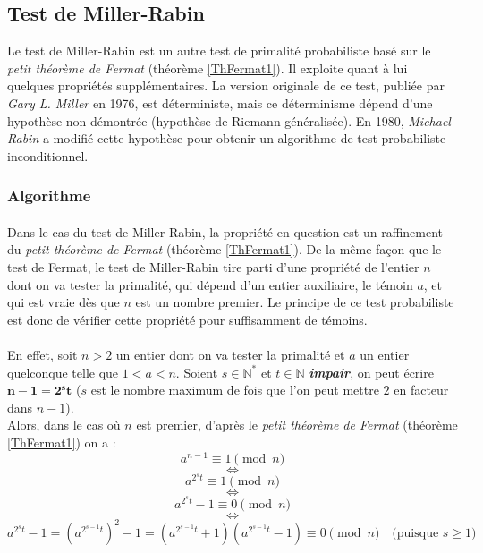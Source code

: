 \subsection{Test de Miller-Rabin}
	Le test de Miller-Rabin est un autre test de primalité probabiliste basé sur le \textit{petit théorème de Fermat} (théorème \ref{ThFermat1}). Il exploite quant à lui quelques propriétés supplémentaires. La version originale de ce test, publiée par \textit{Gary L. Miller} en 1976, est déterministe, mais ce déterminisme dépend d'une hypothèse non démontrée (hypothèse de Riemann généralisée). En 1980, \textit{Michael Rabin} a modifié cette hypothèse pour obtenir un algorithme de test probabiliste inconditionnel.
	
	\subsubsection{Algorithme}
		
		\paragraph{} Dans le cas du test de Miller-Rabin, la propriété en question est un raffinement du \textit{petit théorème de Fermat} (théorème \ref{ThFermat1}). De la même façon que le test de Fermat, le test de Miller-Rabin tire parti d'une propriété de l'entier $n$ dont on va tester la primalité, qui dépend d'un entier auxiliaire, le témoin $a$, et qui est vraie dès que $n$ est un nombre premier. Le principe de ce test probabiliste est donc de vérifier cette propriété pour suffisamment de témoins.
		
		\paragraph{}En effet, soit $n > 2$ un entier dont on va tester la primalité et $a$ un entier quelconque telle que $1 < a < n$. Soient $s \in \mathbb{N}^{*}$ et $t \in \mathbb{N}$ \textbf{\textit{impair}}, on peut écrire $\mathbf{n - 1 = 2^{s}t}$ ($s$ est le nombre maximum de fois que l'on peut mettre $2$ en facteur dans $n - 1$).\\
		Alors, dans le cas où $n$ est premier, d'après le \textit{petit théorème de Fermat} (théorème \ref{ThFermat1}) on a :
		\[a^{n-1}\equiv 1 \pmod n\]
		\[\Leftrightarrow\]
		\[a^{2^{s}t}\equiv 1 \pmod n\]
		\[\Leftrightarrow\]
		\[a^{2^{s}t} - 1 \equiv 0 \pmod n\]
		\[\Leftrightarrow\]
		\[a^{2^{s}t} - 1 = (a^{2^{s-1}t})^{2} - 1 = (a^{2^{s-1}t} + 1)(a^{2^{s-1}t} - 1) \equiv 0 \pmod n	\quad	\text{(puisque } s \geqslant 1 \text{)}\]
		
